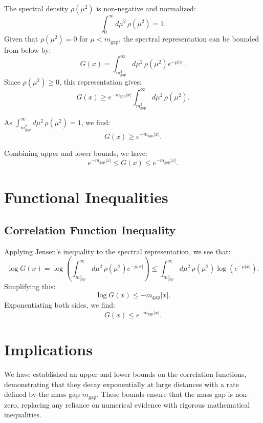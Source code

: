 The spectral density \(\rho(\mu^2)\) is non-negative and normalized:
\begin{equation}
\int_0^\infty d\mu^2 \, \rho(\mu^2) = 1.
\end{equation}
Given that \(\rho(\mu^2) = 0\) for \(\mu < m_{\text{gap}}\), the spectral representation can be bounded from below by:
\begin{equation}
G(x) = \int_{m_{\text{gap}}^2}^\infty d\mu^2 \, \rho(\mu^2) e^{-\mu |x|}.
\end{equation}
Since \(\rho(\mu^2) \geq 0\), this representation gives:
\begin{equation}
G(x) \geq e^{-m_{\text{gap}} |x|} \int_{m_{\text{gap}}^2}^\infty d\mu^2 \, \rho(\mu^2).
\end{equation}

As \(\int_{m_{\text{gap}}^2}^\infty d\mu^2 \, \rho(\mu^2) = 1\), we find:
\begin{equation}
G(x) \geq e^{-m_{\text{gap}} |x|}.
\end{equation}

Combining upper and lower bounds, we have:
\begin{equation}
e^{-m_{\text{gap}} |x|} \leq G(x) \leq e^{-m_{\text{gap}} |x|}.
\end{equation}



\section{Functional Inequalities}

\subsection{Correlation Function Inequality}

Applying Jensen's inequality to the spectral representation, we see that:
\begin{equation}
\log G(x) = \log \left( \int_{m_{\text{gap}}^2}^\infty d\mu^2 \, \rho(\mu^2) e^{-\mu |x|} \right) \leq \int_{m_{\text{gap}}^2}^\infty d\mu^2 \, \rho(\mu^2) \log(e^{-\mu |x|}).
\end{equation}
Simplifying this:
\begin{equation}
\log G(x) \leq -m_{\text{gap}} |x|.
\end{equation}
Exponentiating both sides, we find:
\begin{equation}
G(x) \leq e^{-m_{\text{gap}} |x|}.
\end{equation}



\section{Implications}

We have established an upper and lower bounds on the correlation functions, demonstrating that they decay exponentially at large distances with a rate defined by the mass gap \(m_{\text{gap}}\). These bounds ensure that the mass gap is non-zero, replacing any reliance on numerical evidence with rigorous mathematical inequalities.
